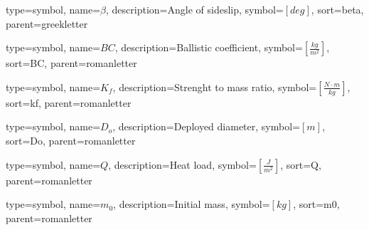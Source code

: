 {
	type=symbol, %
	name={\ensuremath{\beta}}, %
	description={Angle of sideslip}, %
	symbol={$\left[deg \right]$}, %
	sort=beta, %
	parent=greekletter %
}

{
type=symbol, %
name={\ensuremath{BC}}, %
description={Ballistic coefficient}, %
symbol={$\left[\frac{kg}{m^2} \right]$}, %
sort=BC, %
parent=romanletter %
}

{
type=symbol, %
name={\ensuremath{K_f}}, %
description={Strenght to mass ratio}, %
symbol={$\left[\frac{N \cdot m}{kg} \right]$}, %
sort=kf, %
parent=romanletter %
}

{
type=symbol, %
name={\ensuremath{D_o}}, %
description={Deployed diameter}, %
symbol={$\left[m \right]$}, %
sort=Do, %
parent=romanletter %
}

{
type=symbol, %
name={\ensuremath{Q}}, %
description={Heat load}, %
symbol={$\left[\frac{J}{m^2} \right]$}, %
sort=Q, %
parent=romanletter %
}

{
type=symbol, %
name={\ensuremath{m_0}}, %
description={Initial mass}, %
symbol={$\left[kg \right]$}, %
sort=m0, %
parent=romanletter %
}

